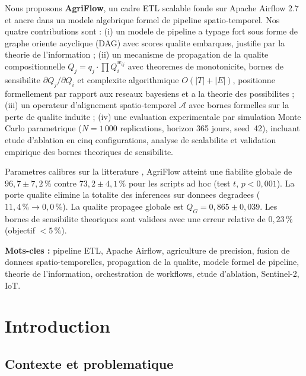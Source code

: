 \documentclass[12pt,a4paper]{article}
\theoremstyle{plain}
\theoremstyle{definition}
\theoremstyle{remark}
\begin{document}
\begin{titlepage}
		Nous proposons \textbf{AgriFlow}, un cadre ETL scalable fonde sur Apache
		Airflow 2.7 et ancre dans un modele algebrique formel de pipeline
		spatio-temporel. Nos quatre contributions sont :
		(i) un modele de pipeline a typage fort sous forme de graphe oriente
		acyclique (DAG) avec scores qualite embarques, justifie par la theorie
		de l'information ;
		(ii) un mecanisme de propagation de la qualite compositionnelle
		$Q_j = q_j \cdot \prod Q_i^{w_{ij}}$ avec theoremes de monotonicite,
		bornes de sensibilite $\partial Q_j/\partial Q_i$ et complexite
		algorithmique $O(|T|+|E|)$, positionne formellement par rapport aux
		reseaux bayesiens et a la theorie des possibilites ;
		(iii) un operateur d'alignement spatio-temporel $\mathcal{A}$ avec
		bornes formelles sur la perte de qualite induite ;
		(iv) une evaluation experimentale par simulation Monte Carlo
		paramet\-rique ($N=1\,000$ replications, horizon 365 jours, seed~42),
		incluant etude d'ablation en cinq configurations, analyse de scalabilite
		et validation empirique des bornes theoriques de sensibilite.
		
		Parametres calibres sur la litterature \cite{iot_review_2025,sentinel2_ard_2022,
			pipeline_survey_2024}, AgriFlow atteint une fiabilite globale de
		$96{,}7 \pm 7{,}2\,\%$ contre $73{,}2 \pm 4{,}1\,\%$ pour les scripts ad hoc
		(test $t$, $p<0{,}001$). La porte qualite elimine la totalite des inferences
		sur donnees degradees ($11{,}4\,\% \to 0{,}0\,\%$). La qualite propagee
		globale est $Q_G = 0{,}865 \pm 0{,}039$. Les bornes de sensibilite theoriques
		sont validees avec une erreur relative de $0{,}23\,\%$ (objectif $< 5\,\%$).
		
		\bigskip
		\noindent\textbf{Mots-cles :}
		pipeline ETL, Apache Airflow, agriculture de precision, fusion de donnees
		spatio-temporelles, propagation de la qualite, modele formel de pipeline,
		theorie de l'information, orchestration de workflows, etude d'ablation,
		Sentinel-2, IoT.
	\end{titlepage}
	
	\tableofcontents
	\newpage
	
	\section{Introduction}
	\label{sec:intro}
	
	\subsection{Contexte et problematique}
	
\end{document}
